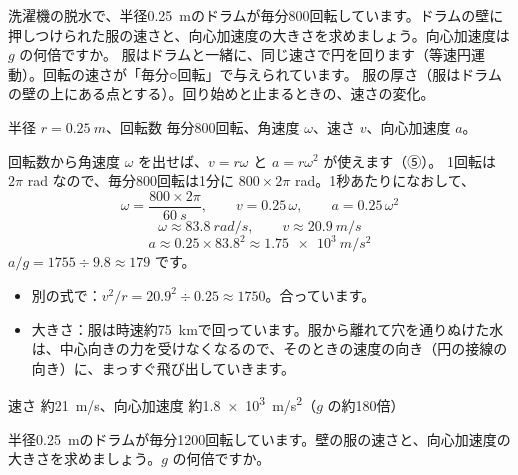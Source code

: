 \begin{phreidai}[洗濯機の脱水]
\label{ph:力-1:ex9}洗濯機の脱水で、半径\qty{0.25}{m}のドラムが毎分800回転しています。ドラムの壁に押しつけられた服の速さと、向心加速度の大きさを求めましょう。向心加速度は $g$ の何倍ですか。
\phbamen
服はドラムと一緒に、同じ速さで円を回ります（等速円運動）。回転の速さが「毎分○回転」で与えられています。
\phmushi
服の厚さ（服はドラムの壁の上にある点とする）。回り始めと止まるときの、速さの変化。
\phzu
\noindent\begin{minipage}[c]{0.36\linewidth}\centering
{}
\end{minipage}\hfill
\begin{minipage}[c]{0.6\linewidth}
半径 $r=\qty{0.25}{m}$、回転数 毎分800回転、角速度 $\omega$、速さ $v$、向心加速度 $a$。
\end{minipage}
\phriyu
回転数から角速度 $\omega$ を出せば、$v=r\omega$ と $a=r\omega^2$ が使えます（⑤）。
\phtateru
1回転は $2\pi$ rad なので、毎分800回転は1分に $800\times2\pi$ rad。1秒あたりになおして、
\[ \omega=\frac{800\times2\pi}{\qty{60}{s}},\qquad v=0.25\,\omega,\qquad a=0.25\,\omega^2 \]
\phtoku
\[ \omega\approx\qty{83.8}{rad/s},\qquad v\approx\qty{20.9}{m/s} \]
\[ a\approx0.25\times83.8^2\approx\qty{1.75e3}{m/s^2} \]
$a/g=1755\div9.8\approx179$ です。
\phtashikame
\begin{itemize}[leftmargin=1.2\zw, itemsep=1pt, topsep=1pt, label={\color{bkTheme}●}]
\item 別の式で：$v^2/r=20.9^2\div0.25\approx1750$。合っています。
\item 大きさ：服は時速約\qty{75}{km}で回っています。服から離れて穴を通りぬけた水は、中心向きの力を受けなくなるので、そのときの速度の向き（円の接線の向き）に、まっすぐ飛び出していきます。
\end{itemize}
\kotae 速さ 約\qty{21}{m/s}、向心加速度 約\qty{1.8e3}{m/s^2}（$g$ の約180倍）
\end{phreidai}
\begin{jibun}
半径\qty{0.25}{m}のドラムが毎分1200回転しています。壁の服の速さと、向心加速度の大きさを求めましょう。$g$ の何倍ですか。
\end{jibun}


